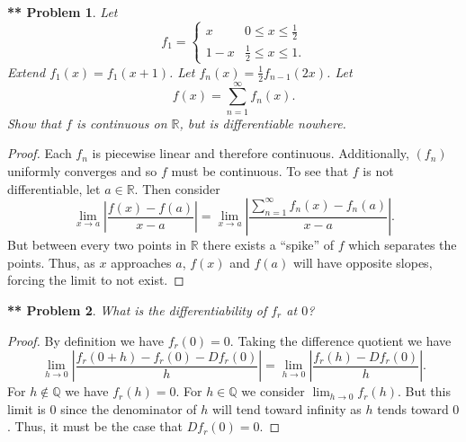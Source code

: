 \documentclass{article}
\newtheorem{**}{** Problem}
\begin{document}
\begin{flushleft}
\begin{**}
Let
\[
f_1 =
\begin{cases}
x & 0 \leq x \leq \frac{1}{2}\\
1-x & \frac{1}{2} \leq x \leq 1.
\end{cases}
\]
Extend $f_1(x) = f_1(x+1)$. Let $f_n(x) = \frac{1}{2} f_{n-1} (2x)$. Let
\[
f(x) = \sum_{n=1}^{\infty} f_n(x).
\]
Show that $f$ is continuous on $\mathbb{R}$, but is differentiable nowhere.
\end{**}
\begin{proof}
Each $f_n$ is piecewise linear and therefore continuous. Additionally, $(f_n)$ uniformly converges and so $f$ must be continuous. To see that $f$ is not differentiable, let $a \in \mathbb{R}$. Then consider
\[
\lim_{x \rightarrow a} \left |\frac{f(x) - f(a)}{x-a} \right | = \lim_{x \rightarrow a} \left |\frac{\sum_{n=1}^{\infty} f_n(x) - f_n(a)}{x-a} \right |.
\]
But between every two points in $\mathbb{R}$ there exists a ``spike'' of $f$ which separates the points. Thus, as $x$ approaches $a$, $f(x)$ and $f(a)$ will have opposite slopes, forcing the limit to not exist.
\end{proof}

\begin{**}
What is the differentiability of $f_r$ at $0$?
\end{**}
\begin{proof}
By definition we have $f_r(0) = 0$. Taking the difference quotient we have
\[
\lim_{h \rightarrow 0} \left | \frac{f_r(0 + h) - f_r(0) - Df_r(0)}{h} \right | = \lim_{h \rightarrow 0} \left | \frac{f_r(h) - Df_r(0)}{h} \right |.
\]
For $h \notin \mathbb{Q}$ we have $f_r(h) = 0$. For $h \in \mathbb{Q}$ we consider $\lim_{h \rightarrow 0} f_r(h)$. But this limit is $0$ since the denominator of $h$ will tend toward infinity as $h$ tends toward $0$. Thus, it must be the case that $Df_r(0) = 0$.
\end{proof}


\end{flushleft}
\end{document}
